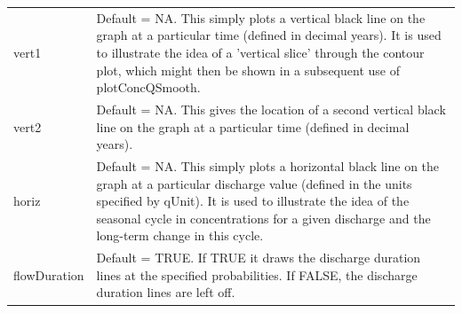 \documentclass[a4paper,11pt]{article}\usepackage[]{graphicx}\usepackage[]{color}
\begin{document}
\begin{table}[ht]
\begin{tabularx}{\textwidth}{lX}
vert1 & Default = NA.  This simply plots a vertical black line on the graph at a particular time (defined in decimal years).  It is used to illustrate the idea of a 'vertical slice' through the contour plot, which might then be shown in a subsequent use of plotConcQSmooth.  \\
vert2 & Default = NA.  This gives the location of a second vertical black line on the graph at a particular time (defined in decimal years). \\
horiz & Default = NA.  This simply plots a horizontal black line on the graph at a particular discharge value (defined in the units specified by qUnit).  It is used to illustrate the idea of the seasonal cycle in concentrations for a given discharge and the long-term change in this cycle.  \\
flowDuration & Default = TRUE.  If TRUE it draws the discharge duration lines at the specified probabilities.  If FALSE, the discharge duration lines are left off.\\
\hline
\end{tabularx}

\end{table}
\end{document}
